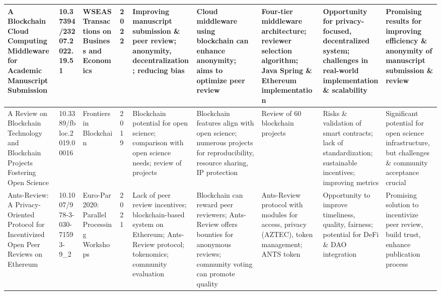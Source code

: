 \documentclass{article}
\begin{document}
\begin{landscape}
\begin{tabularx}{\linewidth}{|p{3.5cm}|p{2.5cm}|p{3cm}|p{1.8cm}|X|X|X|X|X|}
        A Blockchain Cloud Computing Middleware for Academic Manuscript Submission                                                         & 10.37394/23207.2022.19.51       & WSEAS Transactions on Business and Economics                                  & 2022                      & Improving manuscript submission \& peer review; anonymity, decentralization; reducing bias                                  & Cloud middleware using blockchain can enhance anonymity; aims to optimize peer review                                                          & Four-tier middleware architecture; reviewer selection algorithm; Java Spring \& Ethereum implementation & Opportunity for privacy-focused, decentralized system; challenges in real-world implementation \& scalability                       & Promising results for improving efficiency \& anonymity of manuscript submission \& review            \\
        \hline

        A Review on Blockchain Technology and Blockchain Projects Fostering Open Science                                                   & 10.3389/fbloc.2019.00016        & Frontiers in Blockchain                                                       & 2019                      & Blockchain potential for open science; comparison with open science needs; review of projects                               & Blockchain features align with open science; numerous projects for reproducibility, resource sharing, IP protection                            & Review of 60 blockchain projects                                                                        & Risks \& validation of smart contracts; lack of standardization; sustainable incentives; improving metrics                          & Significant potential for open science infrastructure, but challenges \& community acceptance crucial \\
        \hline

        Ants-Review: A Privacy-Oriented Protocol for Incentivized Open Peer Reviews on Ethereum                                            & 10.1007/978-3-030-71593-9\_2    & Euro-Par 2020: Parallel Processing Workshops                                  & 2021                      & Lack of peer review incentives; blockchain-based system on Ethereum; Ants-Review protocol; tokenomics; community evaluation & Blockchain can reward peer reviewers; Ants-Review offers bounties for anonymous reviews; community voting can promote quality                  & Ants-Review protocol with modules for access, privacy (AZTEC), token management; ANTS token             & Opportunity to improve timeliness, quality, fairness; potential for DeFi \& DAO integration                                         & Promising solution to incentivize peer review, build trust, enhance publication process               \\
        \hline


\end{tabularx}
\end{landscape}
\end{document}
